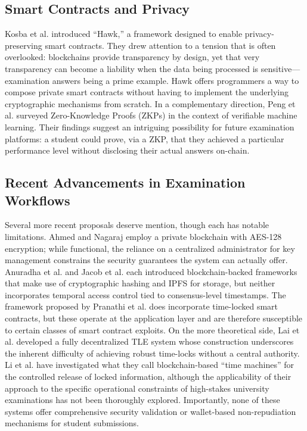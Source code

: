 \documentclass[final,5p,times]{elsarticle}
\begin{document}
\subsection{Smart Contracts and Privacy}
Kosba et al. \cite{7546538} introduced ``Hawk,'' a framework designed to enable privacy-preserving smart contracts. They drew attention to a tension that is often overlooked: blockchains provide transparency by design, yet that very transparency can become a liability when the data being processed is sensitive—examination answers being a prime example. Hawk offers programmers a way to compose private smart contracts without having to implement the underlying cryptographic mechanisms from scratch. In a complementary direction, Peng et al. \cite{zeroknowledgeproof} surveyed Zero-Knowledge Proofs (ZKPs) in the context of verifiable machine learning. Their findings suggest an intriguing possibility for future examination platforms: a student could prove, via a ZKP, that they achieved a particular performance level without disclosing their actual answers on-chain.

\subsection{Recent Advancements in Examination Workflows}
Several more recent proposals deserve mention, though each has notable limitations. Ahmed and Nagaraj \cite{npl1} employ a private blockchain with AES-128 encryption; while functional, the reliance on a centralized administrator for key management constrains the security guarantees the system can actually offer. Anuradha et al. \cite{npl2} and Jacob et al. \cite{npl3} each introduced blockchain-backed frameworks that make use of cryptographic hashing and IPFS for storage, but neither incorporates temporal access control tied to consensus-level timestamps. The framework proposed by Pranathi et al. \cite{npl5} does incorporate time-locked smart contracts, but these operate at the application layer and are therefore susceptible to certain classes of smart contract exploits. On the more theoretical side, Lai et al. \cite{lai2019fully} developed a fully decentralized TLE system whose construction underscores the inherent difficulty of achieving robust time-locks without a central authority. Li et al. \cite{li2024send} have investigated what they call blockchain-based ``time machines'' for the controlled release of locked information, although the applicability of their approach to the specific operational constraints of high-stakes university examinations has not been thoroughly explored. Importantly, none of these systems offer comprehensive security validation or wallet-based non-repudiation mechanisms for student submissions.
\end{document}
